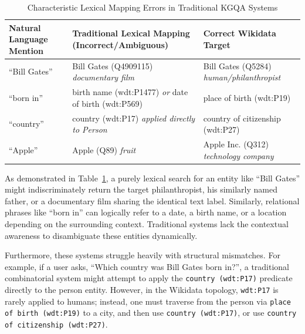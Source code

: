 \begin{table}[htbp]
\centering
\caption{Characteristic Lexical Mapping Errors in Traditional KGQA Systems}
\label{tab:lexical_errors}
\begin{tabular}{p{3.5cm}p{5.5cm}p{4.5cm}}
\hline
\textbf{Natural Language Mention} & \textbf{Traditional Lexical Mapping (Incorrect/Ambiguous)} & \textbf{Correct Wikidata Target} \\
\hline
``Bill Gates'' & Bill Gates (Q4909115) \newline \textit{documentary film} & Bill Gates (Q5284) \newline \textit{human/philanthropist} \\
\vspace{0.1cm}
``born in'' & birth name (wdt:P1477) \newline \textit{or} date of birth (wdt:P569) & place of birth (wdt:P19) \\
\vspace{0.1cm}
``country'' & country (wdt:P17) \newline \textit{applied directly to Person} & country of citizenship (wdt:P27) \\
\vspace{0.1cm}
``Apple'' & Apple (Q89) \newline \textit{fruit} & Apple Inc. (Q312) \newline \textit{technology company} \\
\hline
\end{tabular}
\end{table}

As demonstrated in Table~\ref{tab:lexical_errors}, a purely lexical search for an entity like ``Bill Gates'' might indiscriminately return the target philanthropist, his similarly named father, or a documentary film sharing the identical text label. Similarly, relational phrases like ``born in'' can logically refer to a date, a birth name, or a location depending on the surrounding context. Traditional systems lack the contextual awareness to disambiguate these entities dynamically. 

Furthermore, these systems struggle heavily with structural mismatches. For example, if a user asks, ``Which country was Bill Gates born in?'', a traditional combinatorial system might attempt to apply the \texttt{country (wdt:P17)} predicate directly to the person entity. However, in the Wikidata topology, \texttt{wdt:P17} is rarely applied to humans; instead, one must traverse from the person via \texttt{place of birth (wdt:P19)} to a city, and then use \texttt{country (wdt:P17)}, or use \texttt{country of citizenship (wdt:P27)}. 

